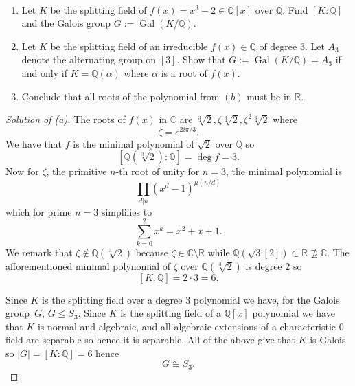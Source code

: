 \begin{prob}[4, Exam 2019]
    \ 
    \begin{enumerate}[label=\alph*)]
        \item Let $K$ be the splitting field of $f(x) = x^3 - 2 
            \in \mathbb Q[x]$ over $\mathbb Q$. Find 
            $[K:\mathbb Q]$ and the Galois group $G :=  
            \operatorname{Gal}(K/\mathbb Q)$.
        \item Let $K$ be the splitting field of an irreducible 
            $f(x) \in \mathbb Q$ of degree $3$. 
            Let $A_3$ denote the alternating group on $[3]$. 
            Show that $G:= \operatorname{Gal}(K/\mathbb Q) = A_3$ if 
            and only if $K = \mathbb Q(\alpha)$ where 
            $\alpha$ is a root of $f(x)$. 
        \item Conclude that all roots of the polynomial from 
            $(b)$ must be in $\mathbb R$.
    \end{enumerate}
\end{prob}
\begin{proof}[Solution of (a)]
    The roots of $f(x)$ in $\mathbb C$ are 
    $\sqrt[3] 2, \zeta \sqrt[3] 2, \zeta^2 \sqrt[3] 2$ where 
    \[
        \zeta = e^{2i\pi/3}.
    \]
    We have that $f$ is the minimal polynomial of $\sqrt 2$ over 
    $\mathbb Q$ so 
    \[
        [\mathbb Q(\sqrt[3] 2) : \mathbb Q] = \deg f = 3. 
    \]
    Now for $\zeta$, the primitive $n$-th root of unity for 
    $n = 3$, the minimal polynomial is 
    \[
        \prod_{d|n} (x^d - 1)^{\mu(n/d)}
    \]
    which for prime $n = 3$ simplifies to 
    \[
        \sum_{k=0}^2 x^k = x^2 + x + 1. 
    \]
    We remark that $\zeta \not\in \mathbb Q(\sqrt[3]2)$ because 
    $\zeta \in \mathbb C\setminus \mathbb R$ while 
    $\mathbb Q(\sqrt 3[2]) \subset \mathbb R \not\supseteq 
    \mathbb C$. 
    The afforementioned minimal polynomial of $\zeta$ over 
    $\mathbb Q(\sqrt[3] 2)$ is degree $2$ so 
    \[
        [K : \mathbb Q] 
        = 2 \cdot 3 = 6. 
    \]

    Since $K$ is the splitting field over a degree $3$ polynomial 
    we have, for the Galois group $G$, $G \leq S_3$. 
    Since $K$ is the splitting field of a $\mathbb Q[x]$ polynomial 
    we have that $K$ is normal and algebraic, and all algebraic 
    extensions of a characteristic $0$ field are separable so 
    hence it is separable. All of the above give that $K$ is 
    Galois so $|G| = [K:\mathbb Q] = 6$ hence 
    \[
        G \cong S_3. 
    \]
\end{proof}

